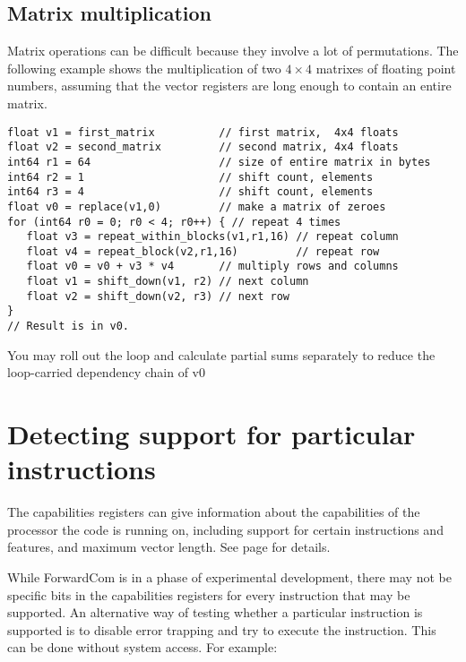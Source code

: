 \documentclass[forwardcom.tex]{subfiles}
\begin{document}
\subsection{Matrix multiplication} \label{matrixMultiplication}
Matrix operations can be difficult because they involve a lot of permutations. The following example shows the multiplication of two $4\times4$ matrixes of floating point numbers, assuming that the vector registers are long enough to contain an entire matrix.
\vv

\begin{example}
\label{exampleMatrixMultiplication}
\end{example}
\begin{lstlisting}[frame=single]
float v1 = first_matrix          // first matrix,  4x4 floats
float v2 = second_matrix         // second matrix, 4x4 floats
int64 r1 = 64                    // size of entire matrix in bytes
int64 r2 = 1                     // shift count, elements
int64 r3 = 4                     // shift count, elements
float v0 = replace(v1,0)         // make a matrix of zeroes
for (int64 r0 = 0; r0 < 4; r0++) { // repeat 4 times
   float v3 = repeat_within_blocks(v1,r1,16) // repeat column
   float v4 = repeat_block(v2,r1,16)         // repeat row
   float v0 = v0 + v3 * v4       // multiply rows and columns
   float v1 = shift_down(v1, r2) // next column
   float v2 = shift_down(v2, r3) // next row
}
// Result is in v0.
\end{lstlisting}
\vv
You may roll out the loop and calculate partial sums separately to
reduce the loop-carried dependency chain of v0
\vv


\section{Detecting support for particular instructions}
\label{DetectingSupportForInstructions}
The capabilities registers can give information about the capabilities of the processor the code is running on, including support for certain instructions and features, and maximum vector length. See page \pageref{table:capabilitiesRegisters} for details.
\vv

While ForwardCom is in a phase of experimental development, there may not be specific bits in the capabilities registers for every instruction that may be supported. An alternative way of testing whether a particular instruction is supported is to disable error trapping and try to execute the instruction. 
This can be done without system access. For example:
\end{document}
